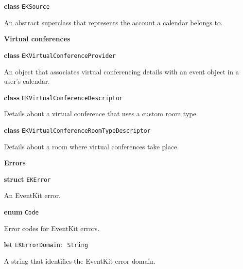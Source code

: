 \documentclass{article}
\begin{document}
\textbf{class} \texttt{EKSource}

An abstract superclass that represents the account a calendar belongs to.

\textbf{Virtual conferences}

\textbf{class} \texttt{EKVirtualConferenceProvider}

An object that associates virtual conferencing details with an event object in a user's calendar.

\textbf{class} \texttt{EKVirtualConferenceDescriptor}

Details about a virtual conference that uses a custom room type.

\textbf{class} \texttt{EKVirtualConferenceRoomTypeDescriptor}

Details about a room where virtual conferences take place.

\textbf{Errors}

\textbf{struct} \texttt{EKError}

An EventKit error.

\textbf{enum} \texttt{Code}

Error codes for EventKit errors.

\textbf{let} \texttt{EKErrorDomain: String}

A string that identifies the EventKit error domain.

\newpage
\end{document}
